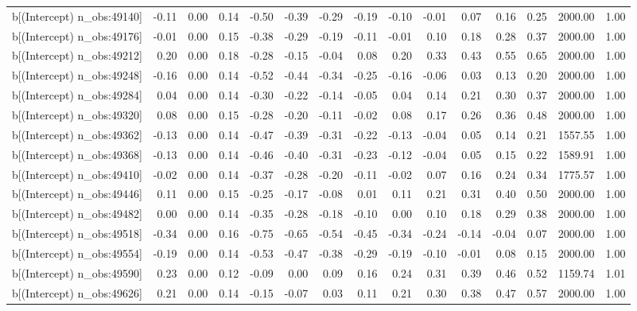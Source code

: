 \begin{table}[ht]
\begin{tabular}{rrrrrrrrrrrrrrr}
  b[(Intercept) n\_obs:49140] & -0.11 & 0.00 & 0.14 & -0.50 & -0.39 & -0.29 & -0.19 & -0.10 & -0.01 & 0.07 & 0.16 & 0.25 & 2000.00 & 1.00 \\ 
  b[(Intercept) n\_obs:49176] & -0.01 & 0.00 & 0.15 & -0.38 & -0.29 & -0.19 & -0.11 & -0.01 & 0.10 & 0.18 & 0.28 & 0.37 & 2000.00 & 1.00 \\ 
  b[(Intercept) n\_obs:49212] & 0.20 & 0.00 & 0.18 & -0.28 & -0.15 & -0.04 & 0.08 & 0.20 & 0.33 & 0.43 & 0.55 & 0.65 & 2000.00 & 1.00 \\ 
  b[(Intercept) n\_obs:49248] & -0.16 & 0.00 & 0.14 & -0.52 & -0.44 & -0.34 & -0.25 & -0.16 & -0.06 & 0.03 & 0.13 & 0.20 & 2000.00 & 1.00 \\ 
  b[(Intercept) n\_obs:49284] & 0.04 & 0.00 & 0.14 & -0.30 & -0.22 & -0.14 & -0.05 & 0.04 & 0.14 & 0.21 & 0.30 & 0.37 & 2000.00 & 1.00 \\ 
  b[(Intercept) n\_obs:49320] & 0.08 & 0.00 & 0.15 & -0.28 & -0.20 & -0.11 & -0.02 & 0.08 & 0.17 & 0.26 & 0.36 & 0.48 & 2000.00 & 1.00 \\ 
  b[(Intercept) n\_obs:49362] & -0.13 & 0.00 & 0.14 & -0.47 & -0.39 & -0.31 & -0.22 & -0.13 & -0.04 & 0.05 & 0.14 & 0.21 & 1557.55 & 1.00 \\ 
  b[(Intercept) n\_obs:49368] & -0.13 & 0.00 & 0.14 & -0.46 & -0.40 & -0.31 & -0.23 & -0.12 & -0.04 & 0.05 & 0.15 & 0.22 & 1589.91 & 1.00 \\ 
  b[(Intercept) n\_obs:49410] & -0.02 & 0.00 & 0.14 & -0.37 & -0.28 & -0.20 & -0.11 & -0.02 & 0.07 & 0.16 & 0.24 & 0.34 & 1775.57 & 1.00 \\ 
  b[(Intercept) n\_obs:49446] & 0.11 & 0.00 & 0.15 & -0.25 & -0.17 & -0.08 & 0.01 & 0.11 & 0.21 & 0.31 & 0.40 & 0.50 & 2000.00 & 1.00 \\ 
  b[(Intercept) n\_obs:49482] & 0.00 & 0.00 & 0.14 & -0.35 & -0.28 & -0.18 & -0.10 & 0.00 & 0.10 & 0.18 & 0.29 & 0.38 & 2000.00 & 1.00 \\ 
  b[(Intercept) n\_obs:49518] & -0.34 & 0.00 & 0.16 & -0.75 & -0.65 & -0.54 & -0.45 & -0.34 & -0.24 & -0.14 & -0.04 & 0.07 & 2000.00 & 1.00 \\ 
  b[(Intercept) n\_obs:49554] & -0.19 & 0.00 & 0.14 & -0.53 & -0.47 & -0.38 & -0.29 & -0.19 & -0.10 & -0.01 & 0.08 & 0.15 & 2000.00 & 1.00 \\ 
  b[(Intercept) n\_obs:49590] & 0.23 & 0.00 & 0.12 & -0.09 & 0.00 & 0.09 & 0.16 & 0.24 & 0.31 & 0.39 & 0.46 & 0.52 & 1159.74 & 1.01 \\ 
  b[(Intercept) n\_obs:49626] & 0.21 & 0.00 & 0.14 & -0.15 & -0.07 & 0.03 & 0.11 & 0.21 & 0.30 & 0.38 & 0.47 & 0.57 & 2000.00 & 1.00 \\ 

\end{tabular}
\end{table}

